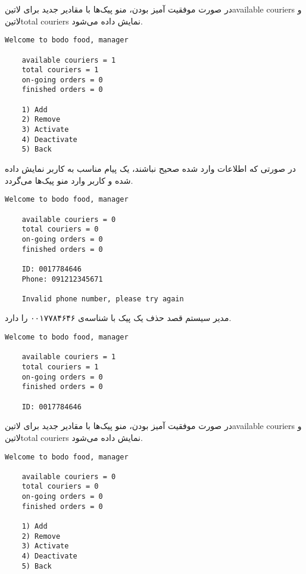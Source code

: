 \documentclass[../main.tex]{subfiles}
\begin{document}
در صورت موفقیت آمیز بودن، منو پیک‌ها با مقادیر جدید برای ‌لاتین{available couriers} و ‌لاتین{total couriers} نمایش داده می‌شود.

\begin{latin}
\begin{lstlisting}[]
    Welcome to bodo food, manager

    available couriers = 1
    total couriers = 1
    on-going orders = 0
    finished orders = 0

    1) Add
    2) Remove
    3) Activate
    4) Deactivate
    5) Back
\end{lstlisting}
\end{latin}

در صورتی که اطلاعات وارد شده صحیح نباشند، یک پیام مناسب به کاربر نمایش داده شده و کاربر وارد منو پیک‌ها می‌گردد.

\begin{latin}
\begin{lstlisting}[]
    Welcome to bodo food, manager

    available couriers = 0
    total couriers = 0
    on-going orders = 0
    finished orders = 0

    ID: 0017784646
    Phone: 091212345671

    Invalid phone number, please try again
\end{lstlisting}
\end{latin}

مدیر سیستم قصد حذف یک پیک با شناسه‌ی ۰۰۱۷۷۸۴۶۴۶ را دارد.

\begin{latin}
\begin{lstlisting}[]
    Welcome to bodo food, manager

    available couriers = 1
    total couriers = 1
    on-going orders = 0
    finished orders = 0

    ID: 0017784646

\end{lstlisting}
\end{latin}

در صورت موفقیت آمیز بودن، منو پیک‌ها با مقادیر جدید برای ‌لاتین{available couriers} و ‌لاتین{total couriers} نمایش داده می‌شود.

\begin{latin}
\begin{lstlisting}[]
    Welcome to bodo food, manager

    available couriers = 0
    total couriers = 0
    on-going orders = 0
    finished orders = 0

    1) Add
    2) Remove
    3) Activate
    4) Deactivate
    5) Back
\end{lstlisting}
\end{latin}
\end{document}
